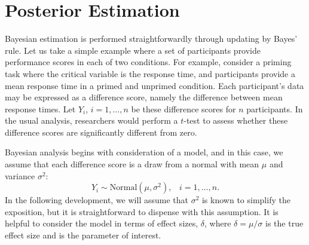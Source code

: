 \section{Posterior Estimation}

Bayesian estimation is performed straightforwardly through updating by Bayes' rule.  Let us take a simple example where a set of participants provide performance scores in each of two conditions.  For example, consider a priming task where the critical variable is the response time, and participants provide a mean response time in a primed and unprimed condition.  Each participant's data may be expressed as a difference score, namely the difference between mean response times.  Let $Y_i$, $i=1,\ldots,n$ be these difference scores for $n$ participants.  In the usual analysis, researchers would perform a $t$-test to assess whether these difference scores are significantly different from zero.

Bayesian analysis begins with consideration of a model, and in this case, we assume that each difference score is a draw from a normal with mean $\mu$ and variance $\sigma^2$:
\begin{equation}
Y_i \sim \mbox{Normal}(\mu,\sigma^2), \;\;\; i=1,\ldots,n.
\end{equation}
In the following development, we will assume that $\sigma^2$ is known to simplify the exposition, but it is straightforward to dispense with this assumption.  It is helpful to consider the model in terms of effect sizes, $\delta$, where $\delta=\mu/\sigma$ is the true effect size and is the parameter of interest.  

